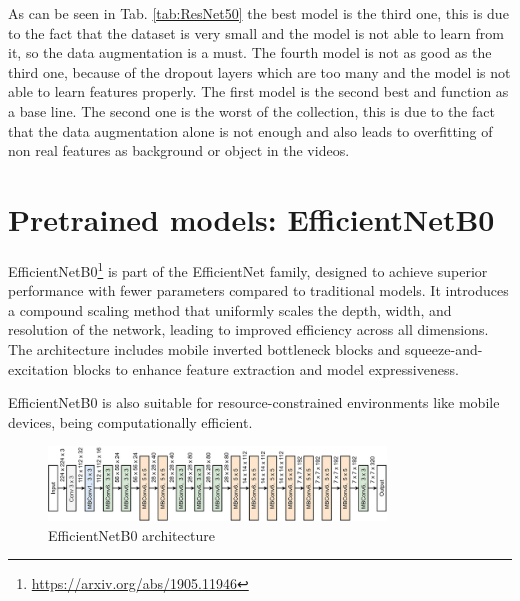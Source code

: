 As can be seen in Tab. \ref{tab:ResNet50} the best model is the third one, this is due to the fact that the dataset is very small and the model is not able to learn from it, so the data augmentation is a must. The fourth model is not as good as the third one, because of the dropout layers which are too many and the model is not able to learn features properly. The first model is the second best and function as a base line. The second one is the worst of the collection, this is due to the fact that the data augmentation alone is not enough and also leads to overfitting of non real features as background or object in the videos.

\section{Pretrained models: EfficientNetB0}
EfficientNetB0\footnote{\url{https://arxiv.org/abs/1905.11946}} is part of the EfficientNet family, designed to achieve superior performance with fewer parameters compared to traditional models.
It introduces a compound scaling method that uniformly scales the depth, width, and resolution of the network, leading to improved efficiency across all dimensions.
The architecture includes mobile inverted bottleneck blocks and squeeze-and-excitation blocks to enhance feature extraction and model expressiveness.

EfficientNetB0 is also suitable for resource-constrained environments like mobile devices, being computationally efficient. 
\begin{figure}[h!]
    \centering
    \includegraphics[width=0.8\textwidth]{images/EfficientNetB0-architecture-36.png}
    \caption{EfficientNetB0 architecture}
    \label{fig:EfficientNetB0architecture}
\end{figure}

